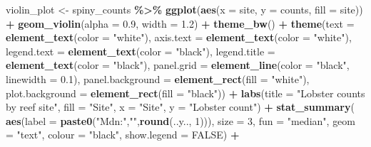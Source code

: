 \documentclass[
]{article}
\newenvironment{Shaded}{\begin{snugshade}}{\end{snugshade}}
\newcommand{\AttributeTok}[1]{\textcolor[rgb]{0.13,0.29,0.53}{#1}}
\newcommand{\ConstantTok}[1]{\textcolor[rgb]{0.56,0.35,0.01}{#1}}
\newcommand{\DecValTok}[1]{\textcolor[rgb]{0.00,0.00,0.81}{#1}}
\newcommand{\FloatTok}[1]{\textcolor[rgb]{0.00,0.00,0.81}{#1}}
\newcommand{\FunctionTok}[1]{\textcolor[rgb]{0.13,0.29,0.53}{\textbf{#1}}}
\newcommand{\NormalTok}[1]{#1}
\newcommand{\OtherTok}[1]{\textcolor[rgb]{0.56,0.35,0.01}{#1}}
\newcommand{\SpecialCharTok}[1]{\textcolor[rgb]{0.81,0.36,0.00}{\textbf{#1}}}
\newcommand{\StringTok}[1]{\textcolor[rgb]{0.31,0.60,0.02}{#1}}
\begin{document}
\begin{Shaded}
\begin{Highlighting}[]
\NormalTok{violin\_plot }\OtherTok{\textless{}{-}}\NormalTok{ spiny\_counts }\SpecialCharTok{\%\textgreater{}\%}
  \FunctionTok{ggplot}\NormalTok{(}\FunctionTok{aes}\NormalTok{(}\AttributeTok{x =}\NormalTok{ site, }\AttributeTok{y =}\NormalTok{ counts, }
             \AttributeTok{fill =}\NormalTok{ site)) }\SpecialCharTok{+}
  \FunctionTok{geom\_violin}\NormalTok{(}\AttributeTok{alpha =} \FloatTok{0.9}\NormalTok{,}
              \AttributeTok{width =} \FloatTok{1.2}\NormalTok{) }\SpecialCharTok{+}  
  \FunctionTok{theme\_bw}\NormalTok{() }\SpecialCharTok{+}
  \FunctionTok{theme}\NormalTok{(}\AttributeTok{text =} \FunctionTok{element\_text}\NormalTok{(}\AttributeTok{color =} \StringTok{"white"}\NormalTok{),}
        \AttributeTok{axis.text =} \FunctionTok{element\_text}\NormalTok{(}\AttributeTok{color =} \StringTok{"white"}\NormalTok{),}
        \AttributeTok{legend.text =} \FunctionTok{element\_text}\NormalTok{(}\AttributeTok{color =} \StringTok{"black"}\NormalTok{),}
        \AttributeTok{legend.title =} \FunctionTok{element\_text}\NormalTok{(}\AttributeTok{color =} \StringTok{"black"}\NormalTok{),}
        \AttributeTok{panel.grid =} \FunctionTok{element\_line}\NormalTok{(}\AttributeTok{color =} \StringTok{"black"}\NormalTok{,}
                                  \AttributeTok{linewidth =} \FloatTok{0.1}\NormalTok{),}
        \AttributeTok{panel.background =} \FunctionTok{element\_rect}\NormalTok{(}\AttributeTok{fill =} \StringTok{"white"}\NormalTok{),}
        \AttributeTok{plot.background =} \FunctionTok{element\_rect}\NormalTok{(}\AttributeTok{fill =} \StringTok{"black"}\NormalTok{)) }\SpecialCharTok{+}
  \FunctionTok{labs}\NormalTok{(}\AttributeTok{title =} \StringTok{"Lobster counts by reef site"}\NormalTok{,}
       \AttributeTok{fill =} \StringTok{"Site"}\NormalTok{,}
       \AttributeTok{x =} \StringTok{"Site"}\NormalTok{, }
       \AttributeTok{y =} \StringTok{"Lobster count"}\NormalTok{) }\SpecialCharTok{+}
  \FunctionTok{stat\_summary}\NormalTok{(}
    \FunctionTok{aes}\NormalTok{(}\AttributeTok{label =} \FunctionTok{paste0}\NormalTok{(}\StringTok{"Mdn:"}\NormalTok{,}\StringTok{""}\NormalTok{,}\FunctionTok{round}\NormalTok{(..y.., }\DecValTok{1}\NormalTok{))),}
    \AttributeTok{size =} \DecValTok{3}\NormalTok{,}
    \AttributeTok{fun =} \StringTok{"median"}\NormalTok{,}
    \AttributeTok{geom =} \StringTok{"text"}\NormalTok{,}
    \AttributeTok{colour =} \StringTok{"black"}\NormalTok{,}
    \AttributeTok{show.legend =} \ConstantTok{FALSE}\NormalTok{) }\SpecialCharTok{+}

\end{Highlighting}
\end{Shaded}
\end{document}
